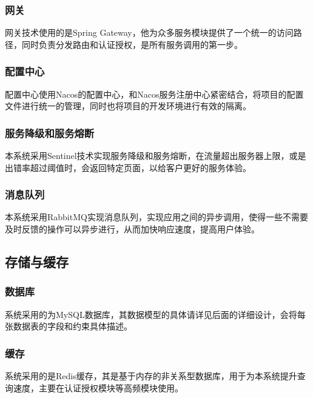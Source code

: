 \subsubsection{网关}
网关技术使用的是Spring Gateway，他为众多服务模块提供了一个统一的访问路径，同时负责分发路由和认证授权，是所有服务调用的第一步。
\subsubsection{配置中心}
配置中心使用Nacos的配置中心，和Nacos服务注册中心紧密结合，将项目的配置文件进行统一的管理，同时也将项目的开发环境进行有效的隔离。
\subsubsection{服务降级和服务熔断}
本系统采用Sentinel技术实现服务降级和服务熔断，在流量超出服务器上限，或是出错率超过阈值时，会返回特定页面，以给客户更好的服务体验。
\subsubsection{消息队列}
本系统采用RabbitMQ实现消息队列，实现应用之间的异步调用，使得一些不需要及时反馈的操作可以异步进行，从而加快响应速度，提高用户体验。


\subsection{存储与缓存}
\subsubsection{数据库}
系统采用的为MySQL数据库，其数据模型的具体请详见后面的详细设计，会将每张数据表的字段和约束具体描述。
\subsubsection{缓存}
系统采用的是Redis缓存，其是基于内存的非关系型数据库，用于为本系统提升查询速度，主要在认证授权模块等高频模块使用。


